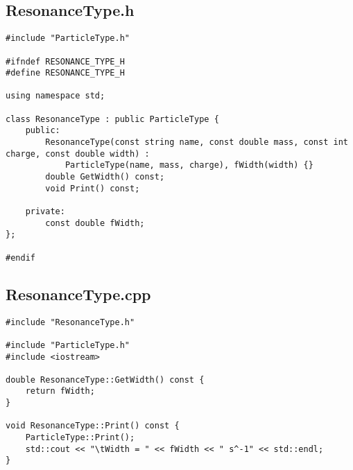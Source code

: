 \documentclass{article}
\begin{document}
\subsection*{ResonanceType.h}
\begin{verbatim}
#include "ParticleType.h"

#ifndef RESONANCE_TYPE_H
#define RESONANCE_TYPE_H

using namespace std;

class ResonanceType : public ParticleType {
    public:
        ResonanceType(const string name, const double mass, const int charge, const double width) :
            ParticleType(name, mass, charge), fWidth(width) {}
        double GetWidth() const;
        void Print() const;
        
    private:
        const double fWidth;
};

#endif
\end{verbatim}

\subsection*{ResonanceType.cpp}
\begin{verbatim}
#include "ResonanceType.h"

#include "ParticleType.h"
#include <iostream>

double ResonanceType::GetWidth() const {
    return fWidth;
}

void ResonanceType::Print() const {
    ParticleType::Print();
    std::cout << "\tWidth = " << fWidth << " s^-1" << std::endl;
}
\end{verbatim}
\end{document}
